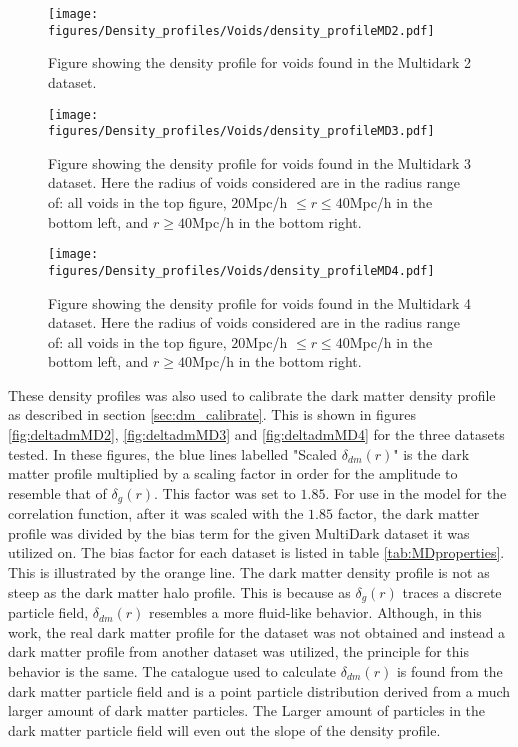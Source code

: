 \begin{figure}[H]
    \texttt{[image: figures/Density\_profiles/Voids/density\_profileMD2.pdf]}
    \caption{Figure showing the density profile for voids found in the Multidark 2 dataset.}
    \label{fig:deltaMD2}
\end{figure}
\begin{figure}[H]
    \texttt{[image: figures/Density\_profiles/Voids/density\_profileMD3.pdf]}
    \caption{Figure showing the density profile for voids found in the Multidark 3 dataset. Here the radius of voids considered are in the radius range of: all voids in the top figure, $20$Mpc/h $\leq r\leq 40$Mpc/h in the bottom left, and $r\geq 40$Mpc/h in the bottom right.}
    \label{fig:deltaMD3}
\end{figure}
\begin{figure}[H]
    \texttt{[image: figures/Density\_profiles/Voids/density\_profileMD4.pdf]}
    \caption{Figure showing the density profile for voids found in the Multidark 4 dataset. Here the radius of voids considered are in the radius range of: all voids in the top figure, $20$Mpc/h $\leq r\leq 40$Mpc/h in the bottom left, and $r\geq 40$Mpc/h in the bottom right.}
    \label{fig:deltaMD4}
\end{figure}
These density profiles was also used to calibrate the dark matter density profile as described in section \ref{sec:dm_calibrate}. This is shown in figures \ref{fig:deltadmMD2}, \ref{fig:deltadmMD3} and \ref{fig:deltadmMD4} for the three datasets tested.
In these figures, the blue lines labelled "Scaled $\delta_{dm}(r)$" is the dark matter profile multiplied by a scaling factor in order for the amplitude to resemble that of $\delta_g(r)$. This factor was set to $1.85$. For use in the model for the correlation function, after it was scaled with the $1.85$ factor, the dark matter profile was divided by the bias term for the given MultiDark dataset it was utilized on. The bias factor for each dataset is listed in table \ref{tab:MDproperties}. This is illustrated by the orange line.
The dark matter density profile is not as steep as the dark matter halo profile. This is because as $\delta_g(r)$ traces a discrete particle field, $\delta_{dm}(r)$ resembles a more fluid-like behavior. Although, in this work, the real dark matter profile for the dataset was not obtained and instead a dark matter profile from another dataset was utilized, the principle for this behavior is the same. The catalogue used to calculate $\delta_{dm}(r)$ is found from the dark matter particle field and is a point particle distribution derived from a much larger amount of dark matter particles. The Larger amount of particles in the dark matter particle field will even out the slope of the density profile.\\\indent 
